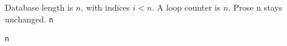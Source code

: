 \documentclass{article}
\begin{document}
Database length is $n$, with indices $i<n$.
A loop counter is $n$.
Prose n stays unchanged.
\label{n}
\verb|n|
\begin{verbatim}
n
\end{verbatim}
\end{document}
